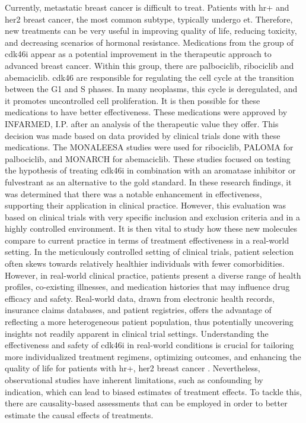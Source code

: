 Currently, metastatic breast cancer is difficult to treat. Patients with \ac{hr+} and \ac{her2} breast cancer, the most common subtype, typically undergo \ac{et}. Therefore, new treatments can be very useful in improving quality of life, reducing toxicity, and decreasing scenarios of hormonal resistance.
Medications from the group of \ac{cdk46i} appear as a potential improvement in the therapeutic approach to advanced breast cancer. Within this group, there are palbociclib, ribociclib and abemaciclib. \ac{cdk46} are responsible for regulating the cell cycle at the transition between the G1 and S phases. In many neoplasms, this cycle is deregulated, and it promotes uncontrolled cell proliferation. It is then possible for these medications to have better effectiveness. These medications were approved by INFARMED, I.P. after an analysis of the therapeutic value they offer. This decision was made based on data provided by clinical trials done with these medications. The MONALEESA \cite{hortobagyiUpdatedResultsMONALEESA22018, slamonPhaseIIIRandomized2018, tripathyRibociclibEndocrineTherapy2018} studies were used for ribociclib, PALOMA \cite{vermaPalbociclibCombinationFulvestrant2016, rugoImpactPalbociclibLetrozole2018, finnCyclindependentKinaseInhibitor2015a} for palbociclib, and MONARCH \cite{goetzMONARCHAbemaciclibInitial2017, sledgeMONARCHAbemaciclibCombination2017} for abemaciclib.
These studies focused on testing the hypothesis of treating \ac{cdk46i} in combination with an aromatase inhibitor or fulvestrant as an alternative to the gold standard. In these research findings, it was determined that there was a notable enhancement in effectiveness, supporting their application in clinical practice.
However, this evaluation was based on clinical trials with very specific inclusion and exclusion criteria and in a highly controlled environment. It is then vital to study how these new molecules compare to current practice in terms of treatment effectiveness in a real-world setting. In the meticulously controlled setting of clinical trials, patient selection often skews towards relatively healthier individuals with fewer comorbidities. However, in real-world clinical practice, patients present a diverse range of health profiles, co-existing illnesses, and medication histories that may influence drug efficacy and safety. Real-world data, drawn from electronic health records, insurance claims databases, and patient registries, offers the advantage of reflecting a more heterogeneous patient population, thus potentially uncovering insights not readily apparent in clinical trial settings. Understanding the effectiveness and safety of \ac{cdk46i} in real-world conditions is crucial for tailoring more individualized treatment regimens, optimizing outcomes, and enhancing the quality of life for patients with \ac{hr+}, \ac{her2} breast cancer \cite{harbeckCDK4InhibitorsHR2021}. Nevertheless, observational studies have inherent limitations, such as confounding by indication, which can lead to biased estimates of treatment effects. To tackle this, there are causality-based assessments that can be employed in order to better estimate the causal effects of treatments.
